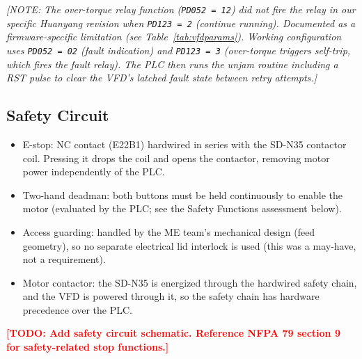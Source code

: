 \documentclass[hidelinks,12pt]{article}
\newcommand{\todo}[1]{\textcolor{red}{\textbf{[TODO: #1]}}}
\newcommand{\note}[1]{\textcolor{PSUblue}{\textit{[NOTE: #1]}}}
\begin{document}
\note{The over-torque relay function (\texttt{PD052 = 12}) did not fire the relay in our specific Huanyang revision when \texttt{PD123 = 2} (continue running). Documented as a firmware-specific limitation (see Table~\ref{tab:vfdparams}). Working configuration uses \texttt{PD052 = 02} (fault indication) and \texttt{PD123 = 3} (over-torque triggers self-trip, which fires the fault relay). The PLC then runs the unjam routine including a RST pulse to clear the VFD's latched fault state between retry attempts.}

\subsection{Safety Circuit}
\begin{itemize}
    \item E-stop: NC contact (E22B1) hardwired in series with the SD-N35 contactor coil. Pressing it drops the coil and opens the contactor, removing motor power independently of the PLC.
    \item Two-hand deadman: both buttons must be held continuously to enable the motor (evaluated by the PLC; see the Safety Functions assessment below).
    \item Access guarding: handled by the ME team's mechanical design (feed geometry), so no separate electrical lid interlock is used (this was a may-have, not a requirement).
    \item Motor contactor: the SD-N35 is energized through the hardwired safety chain, and the VFD is powered through it, so the safety chain has hardware precedence over the PLC.
\end{itemize}

\todo{Add safety circuit schematic. Reference NFPA 79 section 9 for safety-related stop functions.}
\end{document}
